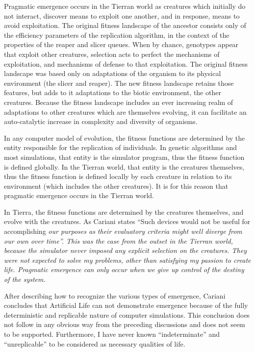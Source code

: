 Pragmatic emergence occurs in the Tierran world as creatures which initially
do not interact, discover means to exploit one another, and in response, means
to avoid exploitation.  The original fitness landscape of the ancestor
consists only of the efficiency parameters of the replication algorithm, in
the context of the properties of the reaper and slicer queues.  When by
chance, genotypes appear that exploit other creatures, selection acts to
perfect the mechanisms of exploitation, and mechanisms of defense to that
exploitation.  The original fitness landscape was based only on adaptations
of the organism to its physical environment (the slicer and reaper).  The
new fitness landscape retains those features, but adds to it adaptations to
the biotic environment, the other creatures.  Because the fitness landscape
includes an ever increasing realm of adaptations to other creatures which
are themselves evolving, it can facilitate an auto-catalytic increase in
complexity and diversity of organisms.

In any computer model of evolution, the fitness functions are determined by
the entity responsible for the replication of individuals.  In genetic
algorithms and most simulations, that entity is the simulator program, thus
the fitness function is defined globally.  In the Tierran world, that entity
is the creatures themselves, thus the fitness function is defined locally
by each creature in relation to its environment (which includes the other
creatures).  It is for this reason that pragmatic emergence occurs in the
Tierran world.

In Tierra, the fitness functions are determined by the creatures themselves,
and evolve with the creatures.  As Cariani states ``Such devices would not
be useful for accomplishing \it our \rm purposes as their evaluatory criteria
might well diverge from our own over time''.  This was the case from the
outset in the Tierran world, because the simulator never imposed any explicit
selection on the creatures.  They were not expected to solve my problems,
other than satisfying my passion to create life.  Pragmatic emergence can
only occur when we give up control of the destiny of the system.

After describing how to recognize the various types of emergence, Cariani
concludes that Artificial Life can not demonstrate emergence because of
the fully deterministic and replicable nature of computer simulations.
This conclusion does not follow in any obvious way from the preceding
discussions and does not seem to be supported.  Furthermore, I have never
known ``indeterminate'' and ``unreplicable'' to be considered as necessary
qualities of life.

